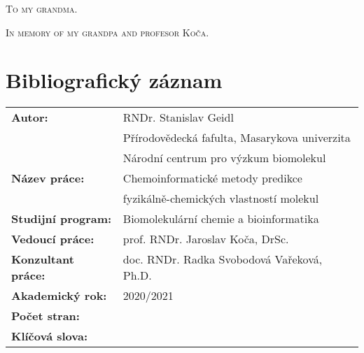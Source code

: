 \documentclass[11pt,b5paper,oneside,final]{book}
\begin{document}
\vspace{5mm}


\vspace{1cm}


\vfill


\vspace{1cm}

\normalsize
\clearpage

\begin{center}
\vspace*{10cm}
  \textsc{To my grandma.}

  \textsc{In memory of my grandpa and profesor Koča.}
\end{center}
\normalsize
\clearpage

\vfill
\section*{Bibliografický záznam}
\def\arraystretch{1.5}
\begin{tabular}{ ll } 
  \textbf{Autor:}            & RNDr. Stanislav Geidl \\
                             & Přírodovědecká fafulta, Masarykova univerzita \\
                             & Národní centrum pro výzkum biomolekul \\
  \textbf{Název práce:}      & Chemoinformatické metody predikce \\
                             & fyzikálně-chemických vlastností molekul \\
  \textbf{Studijní program:} & Biomolekulární chemie a bioinformatika \\
  \textbf{Vedoucí práce:}    & prof. RNDr. Jaroslav Koča, DrSc. \\
  \textbf{Konzultant práce:} & doc. RNDr. Radka Svobodová Vařeková, Ph.D. \\
  \textbf{Akademický rok:}   & 2020/2021 \\
  \textbf{Počet stran:}      & \\
  \textbf{Klíčová slova:}    &  \\
\end{tabular}
\normalsize
\clearpage
\end{document}

